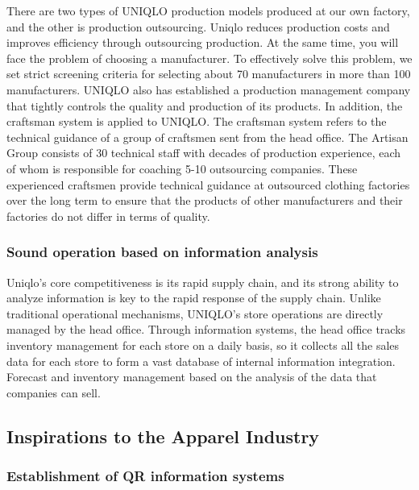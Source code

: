 \documentclass[12pt,a4paper]{article}
\begin{document}
There are two types of UNIQLO production models produced at our own
factory, and the other is production outsourcing. Uniqlo reduces
production costs and improves efficiency through outsourcing production.
At the same time, you will face the problem of choosing a manufacturer.
To effectively solve this problem, we set strict screening criteria for
selecting about 70 manufacturers in more than 100 manufacturers. UNIQLO
also has established a production management company that tightly
controls the quality and production of its products. In addition, the
craftsman system is applied to UNIQLO. The craftsman system refers to
the technical guidance of a group of craftsmen sent from the head
office. The Artisan Group consists of 30 technical staff with decades of
production experience, each of whom is responsible for coaching 5-10
outsourcing companies. These experienced craftsmen provide technical
guidance at outsourced clothing factories over the long term to ensure
that the products of other manufacturers and their factories do not
differ in terms of quality.

\hypertarget{sound-operation-based-on-information-analysis}{%
\subsubsection{Sound operation based on information
analysis}\label{sound-operation-based-on-information-analysis}}

Uniqlo's core competitiveness is its rapid supply chain, and its strong
ability to analyze information is key to the rapid response of the
supply chain. Unlike traditional operational mechanisms, UNIQLO's store
operations are directly managed by the head office. Through information
systems, the head office tracks inventory management for each store on a
daily basis, so it collects all the sales data for each store to form a
vast database of internal information integration. Forecast and
inventory management based on the analysis of the data that companies
can sell.

\hypertarget{inspirations-to-the-apparel-industry}{%
\subsection{Inspirations to the Apparel
Industry}\label{inspirations-to-the-apparel-industry}}

\hypertarget{establishment-of-qr-information-systems}{%
\subsubsection{Establishment of QR information
systems}\label{establishment-of-qr-information-systems}}
\end{document}

